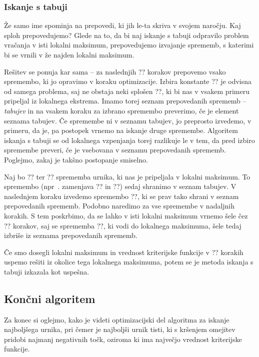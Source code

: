 \documentclass[a4paper, 10pt]{article}
\begin{document}
\subsubsection{Iskanje s tabuji }%

Že samo ime spominja na prepovedi, ki jih le-ta skriva v svojem naročju. Kaj sploh prepovedujemo?
Glede na to, da bi naj iskanje s tabuji odpravilo problem vračanja v isti lokalni maksimum,
prepovedujemo izvajanje sprememb, s katerimi bi se vrnili v že najden lokalni maksimum.

Rešitev se ponuja kar sama -- za naslednjih ?? korakov prepovemo vsako spremembo, ki jo
opravimo v koraku optimizacije. Izbira konstante ?? je odvisna od samega problema, saj
ne obstaja neki splošen ??, ki bi nas v vsakem primeru pripeljal iz lokalnega ekstrema.
Imamo torej seznam prepovedanih sprememb -- \emph{tabujev} in na vsakem koraku za izbrano
spremembo preverimo, če je element seznama tabujev. Če spremembe ni v seznamu tabujev, jo
preprosto izvedemo, v primeru, da je, pa postopek vrnemo na iskanje druge spremembe.
Algoritem iskanja s tabuji se od lokalnega vzpenjanja torej razlikuje le v tem, da pred
izbiro spremembe preveri, če je vsebovana v seznamu prepovedanih sprememb. Poglejmo, zakaj
je takšno postopanje smiselno.

Naj bo ?? ter ?? sprememba urnika, ki nas je pripeljala v lokalni maksimum. To
spremembo (npr~. zamenjava ?? in ??) sedaj shranimo v
seznam tabujev. V naslednjem koraku izvedemo spremembo ??, ki se prav tako shrani v
seznam prepovedanih sprememb. Podobno naredimo za vse spremembe v nadaljnih korakih. S
tem poskrbimo, da se lahko v isti lokalni maksimum vrnemo šele čez ?? korakov, saj
se sprememba ??, ki vodi do lokalnega maksimuma, šele tedaj izbriše iz seznama
prepovedanih sprememb.

Če smo dosegli lokalni maksimum in vrednost kriterijske funkcije v ?? korakih uspemo
rešiti iz okolice tega lokalnega maksimuma, potem se je metoda iskanja s tabuji izkazala
kot uspešna.

\subsection{Končni algoritem }%

Za konec si oglejmo, kako je videti optimizacijski del algoritma za iskanje najboljšega
urnika, pri čemer je najboljši urnik tisti, ki s kršenjem omejitev pridobi najmanj negativnih
točk, oziroma ki ima največjo vrednost kriterijske funkcije.
\end{document}
